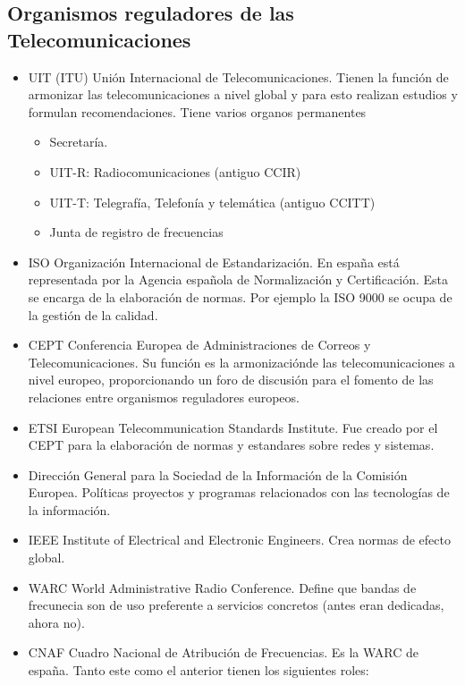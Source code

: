 \subsection{Organismos reguladores de las Telecomunicaciones}
\begin{itemize}
	\item UIT (\acrshort{ITU}) Unión Internacional de Telecomunicaciones. Tienen la función de armonizar las telecomunicaciones a nivel global y para esto realizan estudios y formulan recomendaciones. Tiene varios organos permanentes
	\begin{itemize}
		\item Secretaría.
		\item UIT-R: Radiocomunicaciones (antiguo CCIR)
		\item UIT-T: Telegrafía, Telefonía y telemática (antiguo CCITT)
		\item Junta de registro de frecuencias
	\end{itemize}
	\item \acrshort{ISO} Organización Internacional de Estandarización. En españa está representada por la Agencia española de Normalización y Certificación. Esta se encarga de la elaboración de normas. Por ejemplo la ISO 9000 se ocupa de la gestión de la calidad.
	\item \acrshort{CEPT} Conferencia Europea de Administraciones de Correos y Telecomunicaciones. Su función es la armonizaciónde las telecomunicaciones a nivel europeo, proporcionando un foro de discusión para el fomento de las relaciones entre organismos reguladores europeos. 
	\item \acrshort{ETSI} European Telecommunication Standards Institute. Fue creado por el CEPT para la elaboración de normas y estandares sobre redes y sistemas.
	\item Dirección General para la Sociedad de la Información de la Comisión Europea. Políticas proyectos y programas relacionados con las tecnologías de la información.
	\item \acrshort{IEEE} Institute of Electrical and Electronic Engineers. Crea normas de efecto global.
	\item \acrshort{WARC} World Administrative Radio Conference. Define que bandas de frecunecia son de uso preferente a servicios concretos (antes eran dedicadas, ahora no).
	\item \acrshort{CNAF} Cuadro Nacional de Atribución de Frecuencias. Es la WARC de españa. Tanto este como el anterior tienen los siguientes roles:
	\begin{itemize}

\end{itemize}
\end{itemize}
